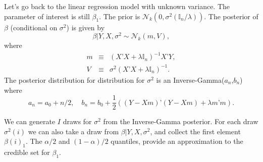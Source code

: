 \documentclass[11pt]{article} %
\begin{document}
 Let’s go back to the linear regression model with unknown variance. The parameter of interest is still $\beta_1$. The prior is $\mathcal{N}_{k}(0, \sigma^2 (\mathbb{I}_n/\lambda))$. The posterior of $\beta$ (conditional on $\sigma^2$) is given by
\[  \beta | Y, X, \sigma^2 \sim \mathcal{N}_{k} ( m , V   ),  \]
where 
\begin{eqnarray*}
m  &\equiv& (X’X + \lambda \mathbb{I}_n)^{-1} X’Y, \\
V  & \equiv & \sigma^2  (X’X + \lambda \mathbb{I}_n)^{-1}.
\end{eqnarray*}
The posterior distribution for distribution for $\sigma^2$ is an Inverse-Gamma($a_n$,$b_n$) where
\[ a_n = a_0 + n/2, \quad b_n = b_0 + \frac{1}{2}( (Y-Xm)’(Y-Xm) + \lambda m’m ). \]

We can generate $I$ draws for $\sigma^2$ from the Inverse-Gamma posterior. For each draw $\sigma^2(i)$ we can also take a draw from $\beta | Y,X, \sigma^2$, and collect the first element $\beta(i)_1$. The $\alpha/2$ and $(1-\alpha)/2$ quantiles, provide an approximation to the credible set for $\beta_1$. 

\newpage


\newpage




\end{document}
